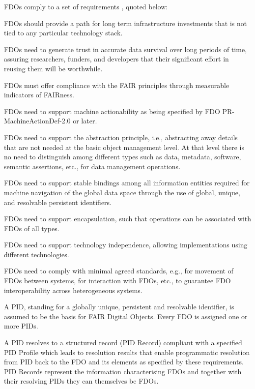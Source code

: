 FDOs comply to a set of requirements \cite{Anders 2023}, quoted below:

\begin{description}
        \small
\item[G1] FDOs should provide a path for long term infrastructure investments that is not tied to any particular technology stack. 
\item[G2] FDOs need to generate trust in accurate data survival over long periods of time, assuring researchers, funders, and developers that their significant effort in reusing them will be worthwhile. 
\item[G3] FDOs must offer compliance with the FAIR principles through measurable indicators of FAIRness.
\item[G4] FDOs need to support machine actionability as being specified by FDO PR-MachineActionDef-2.0 \cite{Weiland 2022b} or later. 
\item[G5] FDOs need to support the abstraction principle, i.e., abstracting away details that are not needed at the basic object management level.  At that level there is no need to distinguish among different types such as data, metadata, software, semantic assertions, etc., for data management operations. 
\item[G6] FDOs need to support stable bindings among all information entities required for machine navigation of the global data space through the use of global, unique, and resolvable persistent identifiers. 
\item[G7] FDOs need to support encapsulation, such that operations can be associated with FDOs of all types.  
\item[G8] FDOs need to support technology independence, allowing implementations using different technologies. 
\item[G9] FDOs need to comply with minimal agreed standards, e.g., for movement of FDOs between systems, for interaction with FDOs, etc., to guarantee FDO interoperability across heterogeneous systems.
\item[FDO-GR1] A PID, standing for a globally unique, persistent and resolvable identifier, is assumed to be the basis for FAIR Digital Objects.  Every FDO is assigned one or more PIDs. 
\item[FDO-GR2] A PID resolves to a structured record (PID Record) compliant with a specified PID Profile which leads to resolution results that enable programmatic resolution from PID back to the FDO and its elements as specified by these requirements.  PID Records represent the information characterising FDOs and together with their resolving PIDs they can themselves be FDOs.

\end{description}
